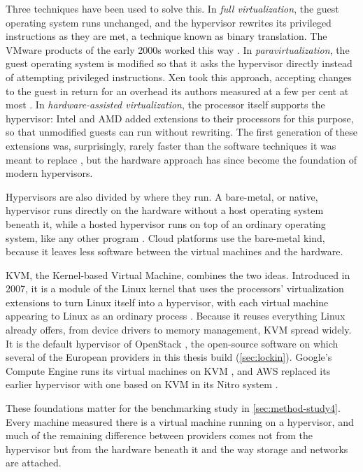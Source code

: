 Three techniques have been used to solve this. In \emph{full virtualization}, the
guest operating system runs unchanged, and the hypervisor rewrites its privileged
instructions as they are met, a technique known as binary translation. The VMware
products of the early 2000s worked this way \cite{Adams_Agesen_2006}. In
\emph{paravirtualization}, the guest operating system is modified so that it asks
the hypervisor directly instead of attempting privileged instructions. Xen took this
approach, accepting changes to the guest in return for an overhead its authors
measured at a few per cent at most \cite{Barham_Xen_2003}. In
\emph{hardware-assisted virtualization}, the processor itself supports the
hypervisor: Intel and AMD added extensions to their processors for this purpose,
so that unmodified guests can run without rewriting. The first generation of
these extensions was, surprisingly, rarely faster than the software techniques
it was meant to replace \cite{Adams_Agesen_2006}, but the hardware approach has
since become the foundation of modern hypervisors.

Hypervisors are also divided by where they run. A bare-metal, or native,
hypervisor runs directly on the hardware without a host operating system beneath
it, while a hosted hypervisor runs on top of an ordinary operating system, like
any other program \cite{NIST_SP800125_2011}. Cloud platforms use the bare-metal
kind, because it leaves less software between the virtual machines and the
hardware.

KVM, the Kernel-based Virtual Machine, combines the two ideas. Introduced in 2007,
it is a module of the Linux kernel that uses the processors' virtualization
extensions to turn Linux itself into a hypervisor, with each virtual machine
appearing to Linux as an ordinary process \cite{Kivity_KVM_2007}. Because it reuses
everything Linux already offers, from device drivers to memory management, KVM
spread widely. It is the default hypervisor of OpenStack \cite{OpenStack_Nova_KVM},
the open-source software on which several of the European providers in this thesis
build (\cref{sec:lockin}). Google's Compute Engine runs its virtual machines on KVM
\cite{Google_GCE_Overview}, and \acs{AWS} replaced its earlier hypervisor with
one based on KVM in its Nitro system \cite{AWS_Nitro_Journey,AWS_EC2_FAQ}.

These foundations matter for the benchmarking study in \cref{sec:method-study4}.
Every machine measured there is a virtual machine running on a hypervisor, and
much of the remaining difference between providers comes not from the hypervisor
but from the hardware beneath it and the way storage and networks are attached.


